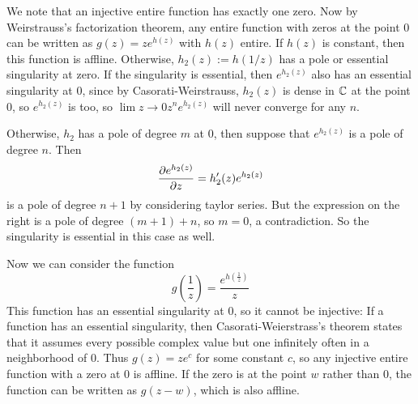 \documentclass{homework}
\begin{document}
                                                                                                                                \begin{solution}
                                                                                                                                We note that an injective entire function has exactly one zero. Now by Weirstrauss's factorization theorem, any entire function with zeros at the point $0$ can be written as $g(z) = ze^{h(z)}$ with $h(z)$ entire. If $h(z)$ is constant, then this function is affline. Otherwise, $h_2(z) := h(1/z)$ has a pole or essential singularity at zero. If the singularity is essential, then $e^{h_2(z)}$ also has an essential singularity at 0, since by Casorati-Weirstrauss, $h_2(z)$ is dense in $\mathbb{C}$ at the point 0, so $e^{h_2(z)}$ is too, so $\lim{z\to 0} z^ne^{h_2(z)}$ will never converge for any $n$.

                                                                                                                                Otherwise, $h_2$ has a pole of degree $m$ at 0, then suppose that $e^{h_2(z)}$ is a pole of degree $n$. Then
                                                                                                                                \[
                                                                                                                                \frac{\partial e^{h_2(z)}}{\partial z} = h_2'(z)e^{h_2(z)}
                                                                                                                                \]
                                                                                                                                is a pole of degree $n+1$ by considering taylor series. But the expression on the right is a pole of degree $(m + 1) + n$, so $m=0$, a contradiction. So the singularity is essential in this case as well.

                                                                                                                                Now we can consider the function 
                                                                                                                                \[
                                                                                                                                g(\frac{1}{z}) = \frac{e^{h(\frac{1}{z})}}{z}
                                                                                                                                \]
                                                                                                                                This function has an essential singularity at 0, so it cannot be injective: If a function has an essential singularity, then Casorati-Weierstrass's theorem states that it assumes every possible complex value but one infinitely often in a neighborhood of 0. Thus $g(z) = ze^c$ for some constant $c$, so any injective entire function with a zero at 0 is affline. If the zero is at the point $w$ rather than 0, the function can be written as $g(z-w)$, which is also affline.
                                                                                                                                \end{solution}
\end{document}
